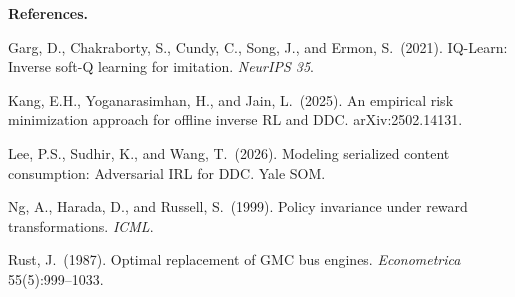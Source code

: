 \documentclass[11pt]{article}
\begin{document}
\bigskip\noindent\textbf{References.}

\smallskip\noindent Garg, D., Chakraborty, S., Cundy, C., Song, J., and Ermon, S.\ (2021). IQ-Learn: Inverse soft-Q learning for imitation. \textit{NeurIPS 35}.

\smallskip\noindent Kang, E.H., Yoganarasimhan, H., and Jain, L.\ (2025). An empirical risk minimization approach for offline inverse RL and DDC. arXiv:2502.14131.

\smallskip\noindent Lee, P.S., Sudhir, K., and Wang, T.\ (2026). Modeling serialized content consumption: Adversarial IRL for DDC. Yale SOM.

\smallskip\noindent Ng, A., Harada, D., and Russell, S.\ (1999). Policy invariance under reward transformations. \textit{ICML}.

\smallskip\noindent Rust, J.\ (1987). Optimal replacement of GMC bus engines. \textit{Econometrica} 55(5):999--1033.
\end{document}
